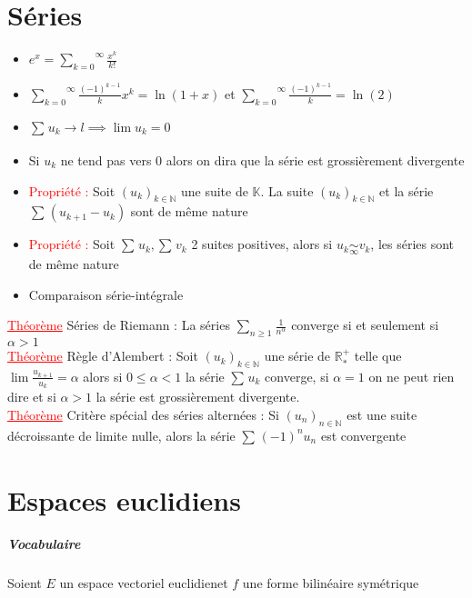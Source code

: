 \documentclass[a4paper, 11pts, french]{article}
\newcommand{\R}{\mathbb{R}}
\newcommand{\N}{\mathbb{N}}
\newcommand{\K}{\mathbb{K}}
\newcommand{\eve}{espace vectoriel euclidien}
\newcommand{\al}{\alpha}
\newcommand{\som}[2]{\overset{#2}{\underset{#1}{\sum}}}
\newcommand{\thm}{\textcolor{red}{\underline{Théorème} }}
\newcommand{\ppt}{\textcolor{red}{Propriété : }}
\newcommand{\limit}[1]{\underset{#1}{\rightarrow}}
\newcommand{\eq}[1]{\underset{#1}{\sim}}
\newcommand{\inv}[1]{\frac{1}{#1}}
\begin{document}
	\section{Séries}
	\begin{itemize}
 		\item $e^x=\som{k=0}{\infty}\frac{x^k}{k!}$
 		\item $\som{k=0}{\infty}\frac{(-1)^{k-1}}{k}x^k=\ln(1+x)$ et $\som{k=0}{\infty}\frac{(-1)^{k-1}}{k}=\ln(2)$
		\item $\som{}{}u_k \limit{}l \implies \lim u_k=0$
		\item Si $u_k$ ne tend pas vers 0 alors on dira que la série est grossièrement divergente
		\item \ppt Soit $(u_k)_{k \in \N}$ une suite de $\K$. La suite $(u_k)_{k \in \N}$ et la série $\som{}{}(u_{k+1}-u_k)$ sont de même nature
		\item \ppt Soit $\som{}{}u_k,\som{}{}v_k$ 2 suites positives, alors si $u_k \eq{\infty} v_k$, les séries sont de même nature
		\item Comparaison série-intégrale
	\end{itemize}
	 \thm Séries de Riemann : La séries $\som{n\geqslant 1}{} \inv{n^\al}$ converge si et seulement si $\al > 1$ \\
	 \thm Règle d'Alembert : Soit $(u_k)_{k \in \N}$ une série de $\R_*^+$ telle que $\lim \frac{u_{k+1}}{u_k}=\al$ alors si $0 \leqslant \al <1$ la série $\som{}{}u_k$ converge, si $\al=1$ on ne peut rien dire et si $\al>1$ la série est grossièrement divergente. \\
	 \thm Critère spécial des séries alternées : Si $(u_n)_{n \in \N}$ est une suite décroissante de limite nulle, alors la série $\som{}{}(-1)^nu_n$ est convergente


	 \section{Espaces euclidiens}
	 
	 \subparagraph{Vocabulaire}
	 
	 Soient \(E\) un \eve et $f$ une forme bilinéaire symétrique
	 
\end{document}
